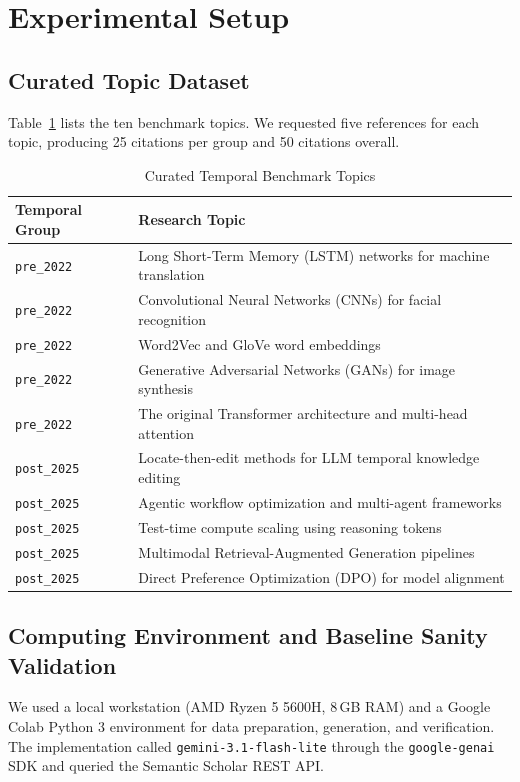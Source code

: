 \documentclass[manuscript,screen]{acmart}
\begin{document}
\section{Experimental Setup}

\subsection{Curated Topic Dataset}
Table~\ref{tab:topics} lists the ten benchmark topics. We requested five references for each topic, producing 25 citations per group and 50 citations overall.

\begin{table}[h]
\centering
\caption{Curated Temporal Benchmark Topics}
\label{tab:topics}
\begin{tabular}{@{}ll@{}}
\toprule
\textbf{Temporal Group} & \textbf{Research Topic} \\ \midrule
\texttt{pre\_2022} & Long Short-Term Memory (LSTM) networks for machine translation \\
\texttt{pre\_2022} & Convolutional Neural Networks (CNNs) for facial recognition \\
\texttt{pre\_2022} & Word2Vec and GloVe word embeddings \\
\texttt{pre\_2022} & Generative Adversarial Networks (GANs) for image synthesis \\
\texttt{pre\_2022} & The original Transformer architecture and multi-head attention \\ \midrule
\texttt{post\_2025} & Locate-then-edit methods for LLM temporal knowledge editing \\
\texttt{post\_2025} & Agentic workflow optimization and multi-agent frameworks \\
\texttt{post\_2025} & Test-time compute scaling using reasoning tokens \\
\texttt{post\_2025} & Multimodal Retrieval-Augmented Generation pipelines \\
\texttt{post\_2025} & Direct Preference Optimization (DPO) for model alignment \\ \bottomrule
\end{tabular}
\end{table}

\subsection{Computing Environment and Baseline Sanity Validation}
We used a local workstation (AMD Ryzen 5 5600H, 8\,GB RAM) and a Google Colab Python 3 environment for data preparation, generation, and verification. The implementation called \texttt{gemini-3.1-flash-lite} through the \texttt{google-genai} SDK and queried the Semantic Scholar REST API.
\end{document}
